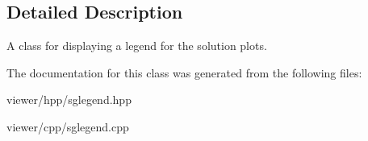 \subsection{Detailed Description}
A class for displaying a legend for the solution plots. 

The documentation for this class was generated from the following files\+:\begin{DoxyCompactItemize}
\item 
viewer/hpp/sglegend.\+hpp\item 
viewer/cpp/sglegend.\+cpp\end{DoxyCompactItemize}
